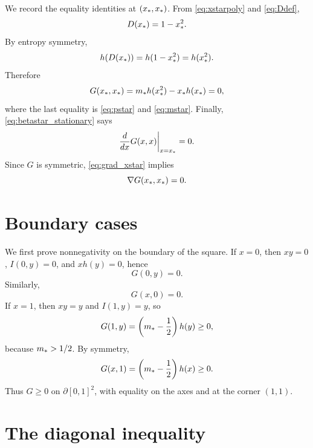 We record the equality identities at \((x_*,x_*)\).  From \eqref{eq:xstarpoly} and \eqref{eq:Ddef},
\begin{equation}\label{eq:Dxstar}
  D(x_*)=1-x_*^2.
\end{equation}
By entropy symmetry,
\begin{equation}\label{eq:h_sym_xstar}
  h(D(x_*))=h(1-x_*^2)=h(x_*^2).
\end{equation}
Therefore
\begin{equation}\label{eq:Gxstarzero}
  G(x_*,x_*)=m_* h(x_*^2)-x_* h(x_*)=0,
\end{equation}
where the last equality is \eqref{eq:pstar} and \eqref{eq:mstar}.  Finally, \eqref{eq:betastar_stationary} says
\begin{equation}\label{eq:grad_xstar}
  \frac{d}{dx}G(x,x)\bigg|_{x=x_*}=0.
\end{equation}
Since \(G\) is symmetric, \eqref{eq:grad_xstar} implies
\begin{equation}\label{eq:gradient_zero}
  \nabla G(x_*,x_*)=0.
\end{equation}

\section{Boundary cases}\label{sec:boundary}

We first prove nonnegativity on the boundary of the square.  If \(x=0\), then \(xy=0\), \(I(0,y)=0\), and \(xh(y)=0\), hence
\begin{equation}\label{eq:axis1}
  G(0,y)=0.
\end{equation}
Similarly,
\begin{equation}\label{eq:axis2}
  G(x,0)=0.
\end{equation}
If \(x=1\), then \(xy=y\) and \(I(1,y)=y\), so
\begin{equation}\label{eq:xone}
  G(1,y)=\left(m_*-\frac12\right)h(y)\ge 0,
\end{equation}
because \(m_*>1/2\).  By symmetry,
\begin{equation}\label{eq:yone}
  G(x,1)=\left(m_*-\frac12\right)h(x)\ge 0.
\end{equation}
Thus \(G\ge0\) on \(\partial[0,1]^2\), with equality on the axes and at the corner \((1,1)\).

\section{The diagonal inequality}\label{sec:diagonal}

